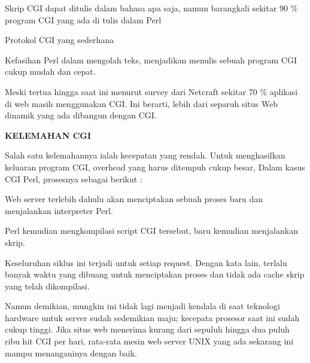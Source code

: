 \documentclass{wileySix}
\begin{document}
\noindent 
\begin{myEnumerate}
	\item Skrip CGI dapat ditulis dalam bahasa apa saja, namun barangkali sekitar 90 $  \%  $ program CGI yang ada di tulis dalam Perl \par
	\noindent 
	\item Protokol CGI yang sederhana \par
	\noindent 
	\item Kefasihan Perl dalam mengolah teks, menjadikan menulis sebuah program CGI cukup mudah dan cepat. \par
	\noindent 
	\item Meski tertua hingga saat ini menurut survey dari Netcraft sekitar 70 $  \%  $ aplikasi di web masih menggunakan CGI. Ini berarti, lebih dari separuh situs Web dinamik yang ada dibangun dengan CGI.\end{myEnumerate}
\par
\vspace{12pt}
\vspace{12pt}
\vspace{12pt}
\vspace{12pt}
\noindent 
\textbf{KELEMAHAN CGI} \par
Salah satu kelemahannya ialah kecepatan yang rendah. Untuk menghasilkan keluaran program CGI, overhead yang harus ditempuh cukup besar, Dalam kasus CGI Perl, prosesnya sebagai berikut : \par
\noindent 
\begin{myEnumerate}
	\item Web server terlebih dahulu akan menciptakan sebuah proses baru dan menjalankan interpreter Perl. \par
	\noindent 
	\item Perl kemudian mengkompilasi script CGI tersebut, baru kemudian menjalankan skrip.\end{myEnumerate}
\par
\vspace{12pt}
Keseluruhan siklus ini terjadi untuk setiap request. Dengan kata lain, terlalu banyak waktu yang dibuang untuk menciptakan proses dan tidak ada cache skrip yang telah dikompilasi. \par
\vspace{12pt}
Namun demikian, mungkin ini tidak lagi menjadi kendala di saat teknologi hardware untuk server sudah sedemikian maju; kecepata prosesor saat ini sudah cukup tinggi. Jika situs web menerima kurang dari sepuluh hingga dua puluh ribu hit CGI per hari, rata-rata mesin web server UNIX yang ada sekarang ini mampu menanganinya dengan baik. \par
\end{document}

